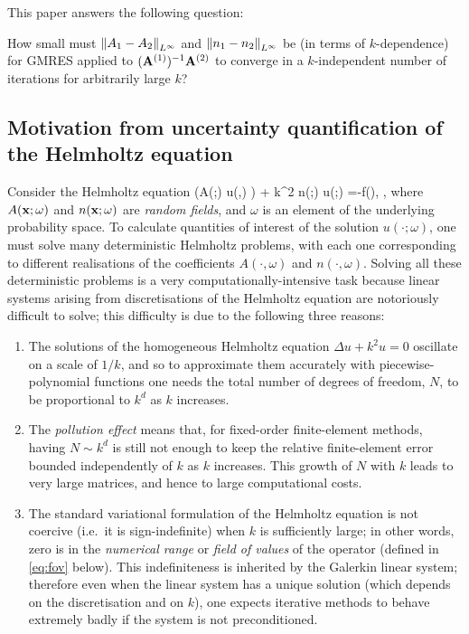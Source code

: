 This paper answers the following question:

\bit
\item[Q1.] How small must $\NLi{\Ao - \At}$ and 
$\NLi{\no - \nt}$ be (in terms of $k$-dependence) for GMRES 
applied to $(\mathbf{A}^{(1)})^{-1}\mathbf{A}^{(2)}$ to converge in a $k$-independent number of iterations
 for arbitrarily large $k$? 
\eit

\subsection{Motivation from uncertainty quantification of the Helmholtz equation} 
Consider the Helmholtz equation 
\beqs%
\nabla\cdot\big(A(\bx;\omega) \nabla u(\bx,\omega) \big) + k^2 n(\bx;\omega) u(\bx;\omega) =-f(\bx), \quad \bx\in\Dp,
\eeqs
where $A(\mathbf{x};\omega)$ and $n(\mathbf{x};\omega)$ are \emph{random fields}, and $\omega$ is an element of the underlying probability space.
To calculate quantities of interest of the solution $u(\cdot;\omega)$, one must solve many deterministic Helmholtz problems, with each one corresponding to different realisations of the coefficients $A(\cdot,\omega)$ and $n(\cdot,\omega)$.
Solving all these deterministic problems is a very computationally-intensive task because linear systems arising from discretisations of the Helmholtz equation are notoriously difficult to solve; this difficulty is due to the following three reasons:
\begin{enumerate}
\item 
The solutions of the homogeneous Helmholtz equation $\Delta u +k^2 u=0$ oscillate on a scale of $1/k$, and so to approximate them accurately with piecewise-polynomial functions one needs the total number of degrees of freedom, $N$, to be proportional to $k^d$ as $k$ increases.
\item The \emph{pollution effect} means that, for fixed-order finite-element methods, having $N\sim k^d$ is still not enough to keep the relative finite-element error bounded independently of $k$ as $k$ increases. This growth of $N$ with $k$ leads to very large matrices, and hence to large computational costs.
\item 
The standard variational formulation of the Helmholtz equation is not coercive (i.e.~it is sign-indefinite) when $k$ is sufficiently large; in other words, zero is in the \emph{numerical range} or \emph{field of values} of the operator (defined in \eqref{eq:fov} below). This indefiniteness is inherited by the Galerkin linear system; therefore 
even when the linear system has a unique solution (which depends on the discretisation and on $k$), one expects iterative methods to behave extremely badly if the system is not preconditioned.
\end{enumerate}

